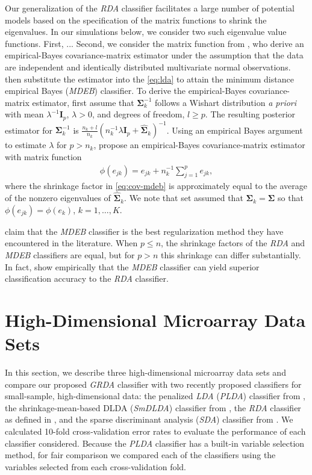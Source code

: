 \documentclass[11pt]{article}
\begin{document}
Our generalization of the \emph{RDA} classifier facilitates a large number of potential models based on the specification of the matrix functions to shrink the eigenvalues. In our simulations below, we consider two such eigenvalue value functions. First, ...  Second, we consider the matrix function from \cite{Srivastava:2007ww}, who derive an empirical-Bayes covariance-matrix estimator under the assumption that the data are independent and identically distributed multivariate normal observations. \cite{Srivastava:2007ww} then substitute the estimator into the \eqref{eq:lda} to attain the minimum distance empirical Bayes (\emph{MDEB}) classifier. To derive the empirical-Bayes covariance-matrix estimator, \cite{Srivastava:2007ww} first assume that $\bm \Sigma_k^{-1}$ follows a Wishart distribution \emph{a priori} with mean $\lambda^{-1} \bm I_p$, $\lambda > 0$, and degrees of freedom, $l \ge p$. The resulting posterior estimator for $\bm \Sigma_k^{-1}$ is $\frac{n_k + l}{n_k}(n_k^{-1}\lambda \bm I_p + \widehat{\bm \Sigma}_k)^{-1}$. Using an empirical Bayes argument to estimate $\lambda$ for $p > n_k$, \cite{Srivastava:2007ww} propose an empirical-Bayes covariance-matrix estimator with matrix function
\begin{align}
	\phi(e_{jk}) = e_{jk} + n_k^{-1} \sum_{j = 1}^p e_{jk},\label{eq:cov-mdeb}
\end{align}
where the shrinkage factor in \eqref{eq:cov-mdeb} is approximately equal to the average of the nonzero eigenvalues of $\widehat{\bm \Sigma}_k$. We note that \cite{Srivastava:2007ww} set assumed that $\bm \Sigma_k = \bm \Sigma$ so that $\phi(e_{jk}) = \phi(e_k)$, $k = 1, \ldots, K$.

\cite{Srivastava:2007ww} claim that the \emph{MDEB} classifier is the best regularization method they have encountered in the literature. When $p \le n$, the shrinkage factors of the \emph{RDA} and \emph{MDEB} classifiers are equal, but for $p > n$ this shrinkage can differ substantially. In fact, \cite{Ramey:2011ji} show empirically that the \emph{MDEB} classifier can yield superior classification accuracy to the \emph{RDA} classifier.

\section{High-Dimensional Microarray Data Sets}

In this section, we describe three high-dimensional microarray data sets and compare our proposed \emph{GRDA} classifier with two recently proposed classifiers for small-sample, high-dimensional data: the penalized \emph{LDA} (\emph{PLDA}) classifier from \cite{Witten:2011kc}, the shrinkage-mean-based DLDA (\emph{SmDLDA}) classifier from \cite{Tong:2012hw}, the \emph{RDA} classifier as defined in \cite{Hastie:2008dt}, and the sparse discriminant analysis (\emph{SDA}) classifier from \cite{Clemmensen:2011kr}. We calculated 10-fold cross-validation error rates \citep{Hastie:2008dt} to evaluate the performance of each classifier considered. Because the \emph{PLDA} classifier has a built-in variable selection method, for fair comparison we compared each of the classifiers using the variables selected from each cross-validation fold.
\end{document}
